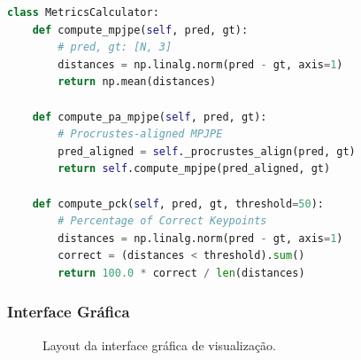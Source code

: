 \documentclass[12pt, a4paper]{article}
\begin{document}
\begin{lstlisting}[language=Python, caption=Módulo 4 - Visualização]
class MetricsCalculator:
    def compute_mpjpe(self, pred, gt):
        # pred, gt: [N, 3]
        distances = np.linalg.norm(pred - gt, axis=1)
        return np.mean(distances)
    
    def compute_pa_mpjpe(self, pred, gt):
        # Procrustes-aligned MPJPE
        pred_aligned = self._procrustes_align(pred, gt)
        return self.compute_mpjpe(pred_aligned, gt)
    
    def compute_pck(self, pred, gt, threshold=50):
        # Percentage of Correct Keypoints
        distances = np.linalg.norm(pred - gt, axis=1)
        correct = (distances < threshold).sum()
        return 100.0 * correct / len(distances)
\end{lstlisting}

\subsubsection{Interface Gráfica}

\begin{figure}[H]
    \centering
    \caption{Layout da interface gráfica de visualização.}
    \label{fig:gui}
\end{figure}
\end{document}

